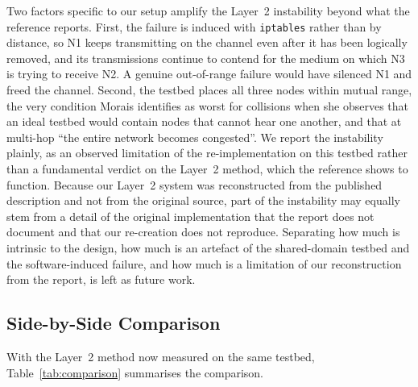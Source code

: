 Two factors specific to our setup amplify the Layer~2 instability beyond what
the reference reports. First, the failure is induced with \texttt{iptables}
rather than by distance, so N1 keeps transmitting on the channel even after it
has been logically removed, and its transmissions continue to contend for the
medium on which N3 is trying to receive N2. A genuine out-of-range failure would
have silenced N1 and freed the channel. Second, the testbed places all three
nodes within mutual range, the very condition Morais identifies as worst for
collisions when she observes that an ideal testbed would contain nodes that
cannot hear one another, and that at multi-hop ``the entire network becomes
congested''. We report the instability plainly, as an observed limitation of the
re-implementation on this testbed rather than a fundamental verdict on the
Layer~2 method, which the reference shows to function. Because our Layer~2 system
was reconstructed from the published description and not from the original
source, part of the instability may equally stem from a detail of the original
implementation that the report does not document and that our re-creation does
not reproduce. Separating how much is intrinsic to the design, how much is an
artefact of the shared-domain testbed and the software-induced failure, and how
much is a limitation of our reconstruction from the report, is left as future
work.

\subsection{Side-by-Side Comparison}
\label{subsec:l2-comparison}

With the Layer~2 method now measured on the same testbed, Table~\ref{tab:comparison}
summarises the comparison.

